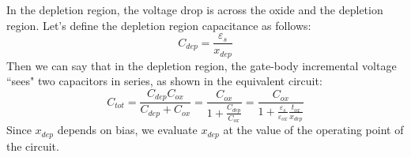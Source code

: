 In the depletion region, the voltage drop is across the oxide and the depletion region.  Let's define the depletion region capacitance as follows:
    \begin{equation}
        {C_{dep}} = \frac{{{\varepsilon _s}}}{{{x_{dep}}}}
    \end{equation}
Then we can say that in the depletion region, the gate-body incremental voltage ``sees" two capacitors in series, as shown in the equivalent circuit:
    \begin{equation}
        {C_{tot}} = \frac{{{C_{dep}}{C_{ox}}}}{{{C_{dep}} + {C_{ox}}}} = \frac{{{C_{ox}}}}{{1 + \frac{{{C_{dep}}}}{{{C_{ox}}}}}} = \frac{{{C_{ox}}}}{{1 + \frac{{{\varepsilon _s}}}{{{\varepsilon _{ox}}}}\frac{{{t_{ox}}}}{{{x_{dep}}}}}}
    \end{equation}
Since $x_{dep}$ depends on bias, we evaluate $x_{dep}$ at the value of the operating point of the circuit.  
